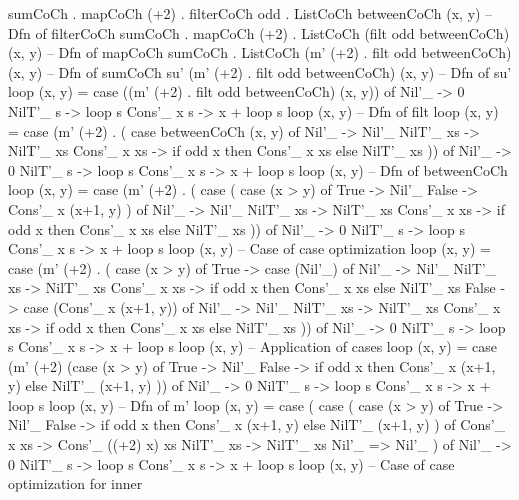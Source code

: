 \begin{spec}
sumCoCh . mapCoCh (+2) . filterCoCh odd . ListCoCh betweenCoCh (x, y)
-- Dfn of filterCoCh
sumCoCh . mapCoCh (+2) . ListCoCh (filt odd betweenCoCh) (x, y)
-- Dfn of mapCoCh
sumCoCh . ListCoCh (m' (+2) . filt odd betweenCoCh) (x, y)
-- Dfn of sumCoCh
su' (m' (+2) . filt odd betweenCoCh) (x, y)
-- Dfn of su'
loop (x, y) = case ((m' (+2) . filt odd betweenCoCh) (x, y)) of
  Nil'_ -> 0
  NilT'_ s -> loop s
  Cons'_ x s -> x + loop s
loop (x, y)
-- Dfn of filt
loop (x, y) = case (m' (+2) . (
                case betweenCoCh (x, y) of 
                    Nil'_ -> Nil'_
                    NilT'_ xs -> NilT'_ xs
                    Cons'_ x xs -> if odd x then Cons'_ x xs else NilT'_ xs
  )) of
  Nil'_ -> 0
  NilT'_ s -> loop s
  Cons'_ x s -> x + loop s
loop (x, y)
-- Dfn of betweenCoCh
loop (x, y) = case (m' (+2) . (
                case (
                  case (x > y) of
                    True -> Nil'_
                    False -> Cons'_ x (x+1, y)
                  ) of 
                  Nil'_ -> Nil'_
                  NilT'_ xs -> NilT'_ xs
                  Cons'_ x xs -> if odd x then Cons'_ x xs else NilT'_ xs
                )) of
  Nil'_ -> 0
  NilT'_ s -> loop s
  Cons'_ x s -> x + loop s
loop (x, y)
-- Case of case optimization
loop (x, y) = case (m' (+2) . (
                case (x > y) of
                  True -> case (Nil'_) of
                    Nil'_ -> Nil'_
                    NilT'_ xs -> NilT'_ xs
                    Cons'_ x xs -> if odd x then Cons'_ x xs else NilT'_ xs
                  False -> case (Cons'_ x (x+1, y)) of
                    Nil'_ -> Nil'_
                    NilT'_ xs -> NilT'_ xs
                    Cons'_ x xs -> if odd x then Cons'_ x xs else NilT'_ xs
                )) of
  Nil'_ -> 0
  NilT'_ s -> loop s
  Cons'_ x s -> x + loop s
loop (x, y)
-- Application of cases
loop (x, y) = case (m' (+2) (case (x > y) of
    True -> Nil'_
    False -> if odd x then Cons'_ x (x+1, y) else NilT'_ (x+1, y)
  )) of
  Nil'_ -> 0
  NilT'_ s -> loop s
  Cons'_ x s -> x + loop s
loop (x, y)
-- Dfn of m'
loop (x, y) = case (
                case (
                  case (x > y) of
                    True -> Nil'_
                    False -> if odd x then Cons'_ x (x+1, y) else NilT'_ (x+1, y)
                ) of
                  Cons'_ x xs -> Cons'_ ((+2) x) xs
                  NilT'_ xs -> NilT'_ xs
                  Nil'_ => Nil'_
              ) of
                Nil'_ -> 0
                NilT'_ s -> loop s
                Cons'_ x s -> x + loop s
loop (x, y)
-- Case of case optimization for inner

\end{spec}
